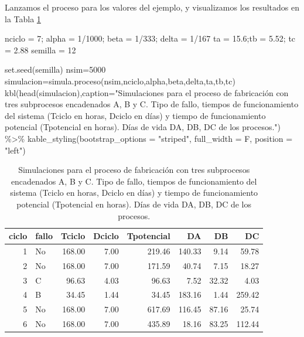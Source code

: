 \documentclass[
]{book}
\newenvironment{Shaded}{\begin{snugshade}}{\end{snugshade}}
\newcommand{\AttributeTok}[1]{\textcolor[rgb]{0.77,0.63,0.00}{#1}}
\newcommand{\DecValTok}[1]{\textcolor[rgb]{0.00,0.00,0.81}{#1}}
\newcommand{\FloatTok}[1]{\textcolor[rgb]{0.00,0.00,0.81}{#1}}
\newcommand{\FunctionTok}[1]{\textcolor[rgb]{0.00,0.00,0.00}{#1}}
\newcommand{\NormalTok}[1]{#1}
\newcommand{\OtherTok}[1]{\textcolor[rgb]{0.56,0.35,0.01}{#1}}
\newcommand{\SpecialCharTok}[1]{\textcolor[rgb]{0.00,0.00,0.00}{#1}}
\newcommand{\StringTok}[1]{\textcolor[rgb]{0.31,0.60,0.02}{#1}}
\theoremstyle{definition}
\theoremstyle{definition}
\theoremstyle{definition}
\theoremstyle{definition}
\theoremstyle{remark}
\begin{document}
Lanzamos el proceso para los valores del ejemplo, y visualizamos los resultados en la Tabla \ref{tab:procesofabricacion}

\begin{Shaded}
\begin{Highlighting}[]
\NormalTok{nciclo }\OtherTok{=} \DecValTok{7}\NormalTok{; alpha }\OtherTok{=} \DecValTok{1}\SpecialCharTok{/}\DecValTok{1000}\NormalTok{; beta }\OtherTok{=} \DecValTok{1}\SpecialCharTok{/}\DecValTok{333}\NormalTok{; delta }\OtherTok{=} \DecValTok{1}\SpecialCharTok{/}\DecValTok{167}
\NormalTok{ta }\OtherTok{=} \FloatTok{15.6}\NormalTok{;tb }\OtherTok{=} \FloatTok{5.52}\NormalTok{; tc }\OtherTok{=} \FloatTok{2.88}
\NormalTok{semilla }\OtherTok{=} \DecValTok{12}

\FunctionTok{set.seed}\NormalTok{(semilla)}
\NormalTok{nsim}\OtherTok{=}\DecValTok{5000}                  
\NormalTok{simulacion}\OtherTok{=}\FunctionTok{simula.proceso}\NormalTok{(nsim,nciclo,alpha,beta,delta,ta,tb,tc)}
\FunctionTok{kbl}\NormalTok{(}\FunctionTok{head}\NormalTok{(simulacion),}\AttributeTok{caption=}\StringTok{"Simulaciones para el proceso de fabricación con tres subprocesos encadenados A, B y C. Tipo de fallo, tiempos de funcionamiento del sistema (Tciclo en horas, Dciclo en días) y tiempo de funcionamiento potencial (Tpotencial en horas). Días de vida DA, DB, DC de los procesos."}\NormalTok{) }\SpecialCharTok{\%\textgreater{}\%}
 \FunctionTok{kable\_styling}\NormalTok{(}\AttributeTok{bootstrap\_options =} \StringTok{"striped"}\NormalTok{, }\AttributeTok{full\_width =}\NormalTok{ F, }\AttributeTok{position =} \StringTok{"left"}\NormalTok{)}
\end{Highlighting}
\end{Shaded}

\begin{table}

\caption{\label{tab:procesofabricacion}Simulaciones para el proceso de fabricación con tres subprocesos encadenados A, B y C. Tipo de fallo, tiempos de funcionamiento del sistema (Tciclo en horas, Dciclo en días) y tiempo de funcionamiento potencial (Tpotencial en horas). Días de vida DA, DB, DC de los procesos.}
\begin{tabular}[t]{r|l|r|r|r|r|r|r}
\hline
ciclo & fallo & Tciclo & Dciclo & Tpotencial & DA & DB & DC\\
\hline
1 & No & 168.00 & 7.00 & 219.46 & 140.33 & 9.14 & 59.78\\
\hline
2 & No & 168.00 & 7.00 & 171.59 & 40.74 & 7.15 & 18.27\\
\hline
3 & C & 96.63 & 4.03 & 96.63 & 7.52 & 32.32 & 4.03\\
\hline
4 & B & 34.45 & 1.44 & 34.45 & 183.16 & 1.44 & 259.42\\
\hline
5 & No & 168.00 & 7.00 & 617.69 & 116.45 & 87.16 & 25.74\\
\hline
6 & No & 168.00 & 7.00 & 435.89 & 18.16 & 83.25 & 112.44\\
\hline
\end{tabular}
\end{table}
\end{document}
